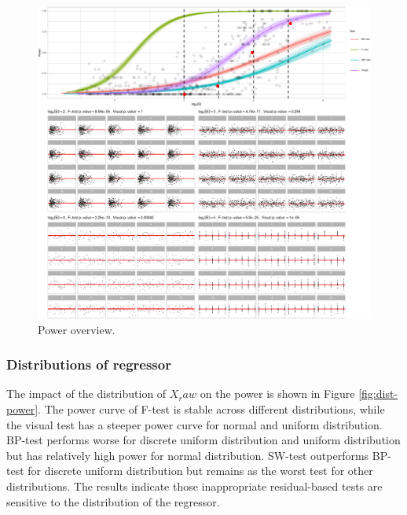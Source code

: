 \documentclass[]{interact}
\theoremstyle{plain}%
\theoremstyle{definition}
\theoremstyle{remark}
\begin{document}
\begin{figure}
\includegraphics[width=1\linewidth]{paper_comparison_files/figure-latex/power-overview-1} \caption{Power overview. \label{fig:power-overview}}\label{fig:power-overview}
\end{figure}

\hypertarget{distributions-of-regressor}{%
\subsubsection{Distributions of
regressor}\label{distributions-of-regressor}}

The impact of the distribution of \(X_raw\) on the power is shown in
Figure \ref{fig:dist-power}. The power curve of F-test is stable across
different distributions, while the visual test has a steeper power curve
for normal and uniform distribution. BP-test performs worse for discrete
uniform distribution and uniform distribution but has relatively high
power for normal distribution. SW-test outperforms BP-test for discrete
uniform distribution but remains as the worst test for other
distributions. The results indicate those inappropriate residual-based
tests are sensitive to the distribution of the regressor.
\end{document}
